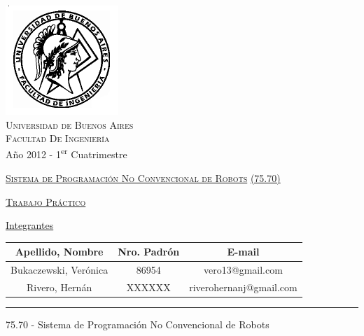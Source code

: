 \documentclass[12pt,titlepage]{article}
\begin{document}
\begin{titlepage}

\thispagestyle{empty}

\begin{center}
\includegraphics[scale=0.55]{./Images/fiuba}\\
\large{\textsc{Universidad de Buenos Aires}}\\
\large{\textsc{Facultad De Ingeniería}}\\
\small{Año 2012 - 1\textsuperscript{er} Cuatrimestre}
\end{center}

\vfill

\begin{center}

\Large{\underline{\textsc{Sistema de Programaci\'on No Convencional de Robots}}}
\Large{\underline{\textsc{(75.70)}}}

\vfill


\Large{\underline{\textsc{Trabajo Pr\'actico}}}

\vfill

\Large\underline{Integrantes} \linebreak\linebreak

\large\addtolength{\tabcolsep}{-3pt}
\begin{tabular}{|| c | c | c ||}
\hline
\textbf{Apellido, Nombre} & \textbf{Nro. Padrón} & \textbf{E-mail} \\
\hline
Bukaczewski, Verónica & 86954 & vero13@gmail.com \\
\hline
Rivero, Hern\'an & XXXXXX & riverohernanj@gmail.com \\
\hline
\end{tabular}
\end{center}

\vfill

\hrule
\vspace{0.2cm}

\noindent\small{75.70 - Sistema de Programaci\'on No Convencional de Robots \hfill}

\end{titlepage}
\end{document}
